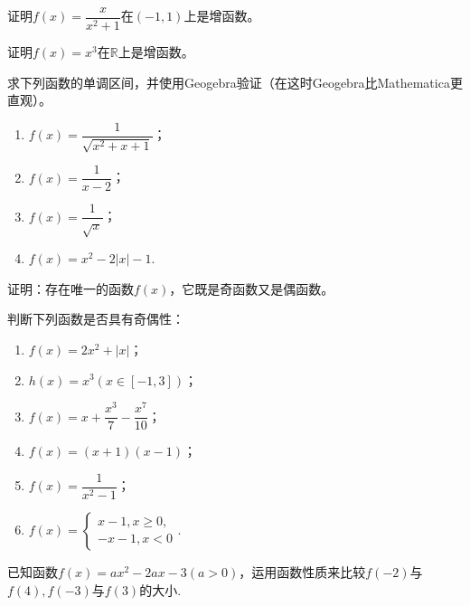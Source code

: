 \documentclass[lang=cn,math=cm,chinesefont=nofont,11pt,scheme=chinese,onecol]{elegantbook}
\begin{document}
\begin{spacing}{1.8}
  \begin{exercise}
    证明$f(x)=\dfrac x{x^2+1}$在$(-1,1)$上是增函数。
  \end{exercise}
  
  \begin{exercise}
    证明$f(x)=x^3$在$\mathbb{R}$上是增函数。
  \end{exercise}
  
  \begin{exercise}
    求下列函数的单调区间，并使用Geogebra验证（在这时Geogebra比Mathematica更直观）。
  \end{exercise}
  
  \begin{enumerate}
    \item $f(x)=\dfrac{1}{\sqrt{x^{2}+x+1}}$；
    \item $f(x)=\dfrac{1}{x-2}$；
    \item $f(x)=\dfrac1{\sqrt{x}}$；
    \item $f(x)=x^{2}-2|x|-1$.
  \end{enumerate}
  
  \begin{exercise}
    证明：存在唯一的函数$f(x)$，它既是奇函数又是偶函数。
  \end{exercise}
  
  \begin{exercise}
    判断下列函数是否具有奇偶性：
  \end{exercise}
  
  \begin{enumerate}
    \item $f(x)=2x^2+|x|$；
    \item $h(x)=x^3(x\in[-1,3])$；
    \item $f(x)=x+\dfrac{x^3}7-\dfrac{x^7}{10}$；
    \item $f(x)=(x+1)(x-1)$；
    \item $f(x)=\dfrac{1}{x^{2}-1}$；
    \item $f(x)=\begin{cases}x-1, x\geqslant0,\\-x-1, x<0\end{cases}$.
  \end{enumerate}
\end{spacing}

\begin{exercise}\label{2017RJB_bx1_P111.B7}
  已知函数$f(x)=ax^2-2ax-3(a>0)$，运用函数性质来比较$f(-2)$与$f(4),f(-3)$与$f(3)$的大小.
\end{exercise}
\end{document}
